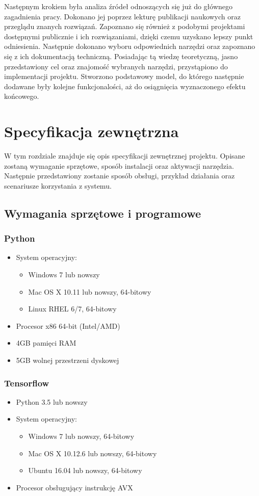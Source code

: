 \documentclass[a4paper,twoside,12pt]{book}
\begin{document}
{{Następnym krokiem była analiza źródeł odnoszących się już do głównego zagadnienia pracy. Dokonano jej poprzez lekturę publikacji naukowych oraz przeglądu znanych rozwiązań. Zapoznano się również z podobymi projektami dostępnymi publicznie i ich rozwiązaniami, dzięki czemu uzyskano lepszy punkt odniesienia. Następnie dokonano wyboru odpowiednich narzędzi oraz zapoznano się z ich dokumentacją techniczną.}
{Posiadając tą wiedzę teoretyczną, jasno przedstawiony cel oraz znajomość wybranych narzędzi, przystąpiono do implementacji projektu. Stworzono podstawowy model, do którego następnie dodawane były kolejne funkcjonalości, aż do osiągnięcia wyznaczonego efektu końcowego.}







\chapter{Specyfikacja zewnętrzna}
{W tym rozdziale znajduje się opis specyfikacji zewnętrznej projektu. Opisane zostaną wymaganie sprzętowe, sposób instalacji oraz aktywacji narzędzia. Następnie przedstawiony zostanie sposób obsługi, przykład działania oraz scenariusze korzystania z systemu.}


\section{ Wymagania sprzętowe i programowe}
\subsection{Python }
\begin{itemize}
\item {System operacyjny:}
\begin{itemize}
\item {Windows 7 lub nowszy}
\item {Mac OS X 10.11 lub nowszy, 64-bitowy}
\item {Linux RHEL 6/7, 64-bitowy}
\end{itemize}
\item{Procesor x86 64-bit  (Intel/AMD)}
\item{4GB pamięci RAM}
\item{5GB wolnej przestrzeni dyskowej}
\end{itemize}

\subsection{Tensorflow}
\begin{itemize}
\item{Python 3.5 lub nowszy}
\item {System operacyjny:}
\begin{itemize}
\item {Windows 7 lub nowszy, 64-bitowy}
\item {Mac OS X 10.12.6 lub nowszy, 64-bitowy}
\item {Ubuntu 16.04 lub nowszy, 64-bitowy}
\end{itemize}
\item{Procesor obsługujący instrukcję AVX}


\end{itemize}}
\end{document}
